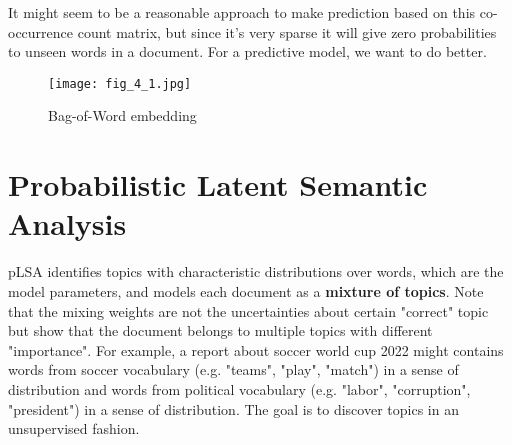 \documentclass[../main.tex]{subfiles}
\begin{document}
\par It might seem to be a reasonable approach to make prediction based on this co-occurrence count matrix, but since it's very sparse it will give zero probabilities to unseen words in a document. For a predictive model, we want to do better.
\begin{figure}[h] 
	\centering 
	\texttt{[image: fig\_4\_1.jpg]} 
	\caption{Bag-of-Word embedding}\label{fig_4_1}
\end{figure}
\section{Probabilistic Latent Semantic Analysis}
pLSA identifies topics with characteristic distributions over words, which are the model parameters, and models each document as a \textbf{mixture of topics}. Note that the mixing weights are not the uncertainties about certain "correct" topic but show that the document belongs to multiple topics with different "importance". For example, a report about soccer world cup 2022 might contains words from soccer vocabulary (e.g. "teams", "play", "match") in a sense of distribution and words from political vocabulary (e.g. "labor", "corruption", "president") in a sense of distribution. The goal is to discover topics in an unsupervised fashion.
\end{document}
